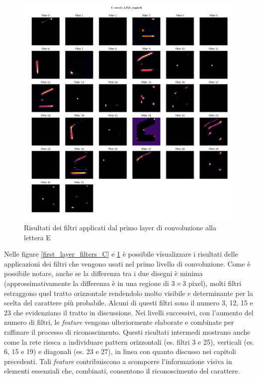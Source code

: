 \documentclass[a4paper,12pt]{article}
\begin{document}
\begin{figure}[H]
\centering
\includegraphics[width=1\linewidth]{images/E_full_avgpool_layer_0.png}
\caption{Risultati dei filtri applicati dal primo layer di convoluzione alla lettera E}
\label{first_layer_filters_E}
\end{figure}

Nelle figure \ref{first_layer_filters_C} e \ref{first_layer_filters_E} è possibile visualizzare i risultati delle applicazioni dei filtri che vengono usati nel primo livello di convoluzione. Come è possibile notare, anche se la differenza tra i due disegni è minima (approssimativamente la differenza è in una regione di $3 \times 3$ pixel), molti filtri estraggono quel tratto orizzontale rendendolo molto visibile e determinante per la scelta del carattere più probabile. Alcuni di questi filtri sono il numero 3, 12, 15 e 23 che evidenziano il tratto in discussione.
Nei livelli successivi, con l'aumento del numero di filtri, le \textit{feature} vengono ulteriormente elaborate e combinate per raffinare il processo di riconoscimento.  
Questi risultati intermedi mostrano anche come la rete riesca a individuare pattern orizzontali (es. filtri 3 e 25), verticali (es. 6, 15 e 19) e diagonali (es. 23 e 27), in linea con quanto discusso nei capitoli precedenti. Tali \textit{feature} contribuiscono a scomporre l'informazione visiva in elementi essenziali che, combinati, consentono il riconoscimento del carattere.
\end{document}
